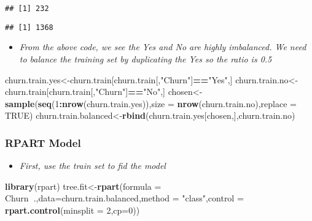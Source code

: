 \documentclass[]{article}
\newenvironment{Shaded}{\begin{snugshade}}{\end{snugshade}}
\newcommand{\DataTypeTok}[1]{\textcolor[rgb]{0.13,0.29,0.53}{#1}}
\newcommand{\DecValTok}[1]{\textcolor[rgb]{0.00,0.00,0.81}{#1}}
\newcommand{\KeywordTok}[1]{\textcolor[rgb]{0.13,0.29,0.53}{\textbf{#1}}}
\newcommand{\NormalTok}[1]{#1}
\newcommand{\OperatorTok}[1]{\textcolor[rgb]{0.81,0.36,0.00}{\textbf{#1}}}
\newcommand{\OtherTok}[1]{\textcolor[rgb]{0.56,0.35,0.01}{#1}}
\newcommand{\StringTok}[1]{\textcolor[rgb]{0.31,0.60,0.02}{#1}}
\providecommand{\tightlist}{%
  \setlength{\itemsep}{0pt}\setlength{\parskip}{0pt}}
\begin{document}
\begin{verbatim}
## [1] 232
\end{verbatim}

\begin{Shaded}
\end{Shaded}

\begin{verbatim}
## [1] 1368
\end{verbatim}

\begin{itemize}
\tightlist
\item
  \emph{From the above code, we see the Yes and No are highly
  imbalanced. We need to balance the training set by duplicating the Yes
  so the ratio is 0.5}
\end{itemize}

\begin{Shaded}
\begin{Highlighting}[]
\NormalTok{churn.train.yes<-churn.train[churn.train[,}\StringTok{"Churn"}\NormalTok{]}\OperatorTok{==}\StringTok{"Yes"}\NormalTok{,]}
\NormalTok{churn.train.no<-churn.train[churn.train[,}\StringTok{"Churn"}\NormalTok{]}\OperatorTok{==}\StringTok{"No"}\NormalTok{,]}
\NormalTok{chosen<-}\KeywordTok{sample}\NormalTok{(}\KeywordTok{seq}\NormalTok{(}\DecValTok{1}\OperatorTok{:}\KeywordTok{nrow}\NormalTok{(churn.train.yes)),}\DataTypeTok{size =} \KeywordTok{nrow}\NormalTok{(churn.train.no),}\DataTypeTok{replace =} \OtherTok{TRUE}\NormalTok{)}
\NormalTok{churn.train.balanced<-}\KeywordTok{rbind}\NormalTok{(churn.train.yes[chosen,],churn.train.no)}
\end{Highlighting}
\end{Shaded}

\hypertarget{rpart-model}{%
\subsubsection{RPART Model}\label{rpart-model}}

\begin{itemize}
\tightlist
\item
  \emph{First, use the train set to fid the model}
\end{itemize}

\begin{Shaded}
\begin{Highlighting}[]
\KeywordTok{library}\NormalTok{(rpart)}
\NormalTok{tree.fit<-}\KeywordTok{rpart}\NormalTok{(}\DataTypeTok{formula =}\NormalTok{ Churn}\OperatorTok{~}\NormalTok{.,}\DataTypeTok{data=}\NormalTok{churn.train.balanced,}\DataTypeTok{method =} \StringTok{"class"}\NormalTok{,}\DataTypeTok{control =} \KeywordTok{rpart.control}\NormalTok{(}\DataTypeTok{minsplit =} \DecValTok{2}\NormalTok{,}\DataTypeTok{cp=}\DecValTok{0}\NormalTok{))}
\end{Highlighting}
\end{Shaded}
\end{document}
